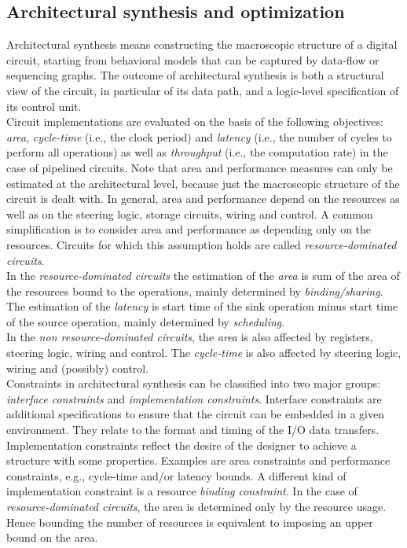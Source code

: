 \subsection{Architectural synthesis and optimization}
Architectural synthesis means constructing the macroscopic structure of a digital circuit, starting from behavioral models that can be captured by data-flow or sequencing graphs. The outcome of architectural synthesis is both a structural view of the circuit, in particular of its data path, and a logic-level specification of its control unit.\\
Circuit implementations are evaluated on the basis of the following objectives: \textit{area}, \textit{cycle-time} (i.e., the clock period) and \textit{latency} (i.e., the number of cycles to perform all operations) as well as \textit{throughput} (i.e., the computation rate) in the case of pipelined circuits. Note that area and
performance measures can only be estimated at the architectural level, because just the macroscopic structure of the circuit is dealt with.  In  general, area and performance depend on the resources as well as on the steering logic, storage circuits, wiring and control.  A  common simplification is to consider area and performance as depending only on the resources. Circuits for which this assumption holds are called \textit{resource-dominated circuits}.\\
In the \textit{resource-dominated circuits} the estimation of the \textit{area} is sum of the area of the resources bound to the operations, mainly determined by  \textit{binding/sharing}. The estimation of the \textit{latency} is start time of the sink operation minus start time of the source operation, mainly determined by  \textit{scheduling}.\\
In the \textit{non resource-dominated circuits}, the \textit{area} is also affected by registers, steering logic, wiring and control. The \textit{cycle-time} is also affected by steering logic, wiring and (possibly) control.\\
Constraints in architectural synthesis can  be  classified into two major groups:  \textit{interface constraints}  and  \textit{implementation constraints}. Interface constraints are additional specifications to ensure that the circuit can be embedded in a given environment. They relate to the format and timing of the I/O data transfers. Implementation constraints reflect the desire of the designer to achieve a structure with some properties. Examples are area constraints and performance constraints, e.g.,  cycle-time  and/or  latency  bounds. A  different kind  of  implementation constraint is a resource \textit{binding constraint}. In the case of \textit{resource-dominated circuits}, the area is determined only by the resource usage. Hence bounding the number of resources is equivalent to imposing an upper bound on the area.
